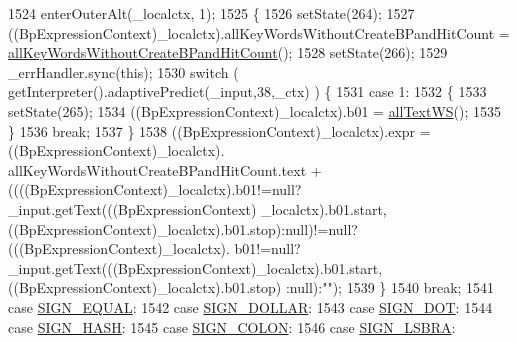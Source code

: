 \begin{DoxyCode}
1524         enterOuterAlt(\_localctx, 1);
1525         \{
1526         setState(264);
1527         ((BpExpressionContext)\_localctx).allKeyWordsWithoutCreateBPandHitCount = 
      \hyperlink{classgov_1_1nasa_1_1jpf_1_1inspector_1_1client_1_1parser_1_1_console_grammar_parser_aff31036dcee67dbba83def31e4761e4e}{allKeyWordsWithoutCreateBPandHitCount}();
1528         setState(266);
1529         \_errHandler.sync(\textcolor{keyword}{this});
1530         \textcolor{keywordflow}{switch} ( getInterpreter().adaptivePredict(\_input,38,\_ctx) ) \{
1531         \textcolor{keywordflow}{case} 1:
1532           \{
1533           setState(265);
1534           ((BpExpressionContext)\_localctx).b01 = \hyperlink{classgov_1_1nasa_1_1jpf_1_1inspector_1_1client_1_1parser_1_1_console_grammar_parser_adc161fc81eedd939154fd25e889f5b28}{allTextWS}();
1535           \}
1536           \textcolor{keywordflow}{break};
1537         \}
1538          ((BpExpressionContext)\_localctx).expr =  ((BpExpressionContext)\_localctx).
      allKeyWordsWithoutCreateBPandHitCount.text +  ((((BpExpressionContext)\_localctx).b01!=null?\_input.getText(((BpExpressionContext)
      \_localctx).b01.start,((BpExpressionContext)\_localctx).b01.stop):null)!=null?(((BpExpressionContext)\_localctx).
      b01!=null?\_input.getText(((BpExpressionContext)\_localctx).b01.start,((BpExpressionContext)\_localctx).b01.stop)
      :null):\textcolor{stringliteral}{""}); 
1539         \}
1540         \textcolor{keywordflow}{break};
1541       \textcolor{keywordflow}{case} \hyperlink{classgov_1_1nasa_1_1jpf_1_1inspector_1_1client_1_1parser_1_1_console_grammar_parser_aa20156acc053ae99f46688b4669b5fed}{SIGN\_EQUAL}:
1542       \textcolor{keywordflow}{case} \hyperlink{classgov_1_1nasa_1_1jpf_1_1inspector_1_1client_1_1parser_1_1_console_grammar_parser_a04caa506d8df430fcc630be094680098}{SIGN\_DOLLAR}:
1543       \textcolor{keywordflow}{case} \hyperlink{classgov_1_1nasa_1_1jpf_1_1inspector_1_1client_1_1parser_1_1_console_grammar_parser_a7c2c9459d2cd462873192e1950dc5a6c}{SIGN\_DOT}:
1544       \textcolor{keywordflow}{case} \hyperlink{classgov_1_1nasa_1_1jpf_1_1inspector_1_1client_1_1parser_1_1_console_grammar_parser_a51f5ea8b85c8f5f0aacca4332e178db6}{SIGN\_HASH}:
1545       \textcolor{keywordflow}{case} \hyperlink{classgov_1_1nasa_1_1jpf_1_1inspector_1_1client_1_1parser_1_1_console_grammar_parser_a1d9b391179ea15ea4908873b6bfd4e20}{SIGN\_COLON}:
1546       \textcolor{keywordflow}{case} \hyperlink{classgov_1_1nasa_1_1jpf_1_1inspector_1_1client_1_1parser_1_1_console_grammar_parser_ab28cc14e8d61823723f1c877dc8078e9}{SIGN\_LSBRA}:

\end{DoxyCode}
